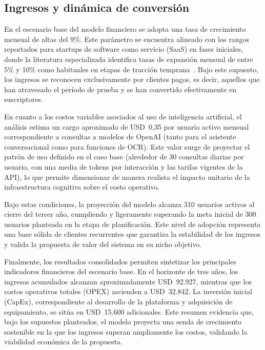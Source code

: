 \subsection{Ingresos y dinámica de conversión}

En el escenario base del modelo financiero se adopta una tasa de crecimiento mensual de altas del 9\%. Este parámetro se encuentra alineado con los rangos reportados para startups de software como servicio (SaaS) en fases iniciales, donde la literatura especializada identifica tasas de expansión mensual de entre 5\% y 10\% como habituales en etapas de tracción temprana~\parencite{burkland2024ltvcac}. Bajo este supuesto, los ingresos se reconocen exclusivamente por clientes pagos, es decir, aquellos que han atravesado el período de prueba y se han convertido efectivamente en suscriptores.

En cuanto a los costos variables asociados al uso de inteligencia artificial, el análisis estima un cargo aproximado de USD~0,35 por usuario activo mensual correspondiente a consultas a modelos de OpenAI (tanto para el asistente conversacional como para funciones de OCR). Este valor surge de proyectar el patrón de uso definido en el caso base (alrededor de 30 consultas diarias por usuario, con una media de tokens por interacción y las tarifas vigentes de la API), lo que permite dimensionar de manera realista el impacto unitario de la infraestructura cognitiva sobre el costo operativo.

Bajo estas condiciones, la proyección del modelo alcanza 310 usuarios activos al cierre del tercer año, cumpliendo y ligeramente superando la meta inicial de 300 usuarios planteada en la etapa de planificación. Este nivel de adopción representa una base sólida de clientes recurrentes que garantiza la estabilidad de los ingresos y valida la propuesta de valor del sistema en su nicho objetivo.

Finalmente, los resultados consolidados permiten sintetizar los principales indicadores financieros del escenario base. En el horizonte de tres años, los ingresos acumulados alcanzan aproximadamente USD~92.927, mientras que los costos operativos totales (OPEX) ascienden a USD~32.842. La inversión inicial (CapEx), correspondiente al desarrollo de la plataforma y adquisición de equipamiento, se sitúa en USD~15.600 adicionales. Este resumen evidencia que, bajo los supuestos planteados, el modelo proyecta una senda de crecimiento sostenible en la que los ingresos superan ampliamente los costos, validando la viabilidad económica de la propuesta.


